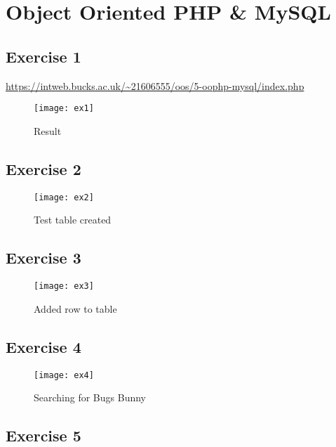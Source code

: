 \chapter{Object Oriented PHP \& MySQL}
\graphicspath{{5-oophp-mysql/images/}}

\section{Exercise 1}

\url{https://intweb.bucks.ac.uk/~21606555/oos/5-oophp-mysql/index.php}

\captionsetup{type=figure}


\captionsetup{type=figure}


\begin{figure}[H]
  \caption{Result}
  \centering
  \texttt{[image: ex1]}
\end{figure}

\section{Exercise 2}

\begin{figure}[H]
  \caption{Test table created}
  \centering
  \texttt{[image: ex2]}
\end{figure}

\section{Exercise 3}

\begin{figure}[H]
  \caption{Added row to table}
  \centering
  \texttt{[image: ex3]}
\end{figure}

\section{Exercise 4}

\begin{figure}[H]
  \caption{Searching for Bugs Bunny}
  \centering
  \texttt{[image: ex4]}
\end{figure}

\section{Exercise 5}

